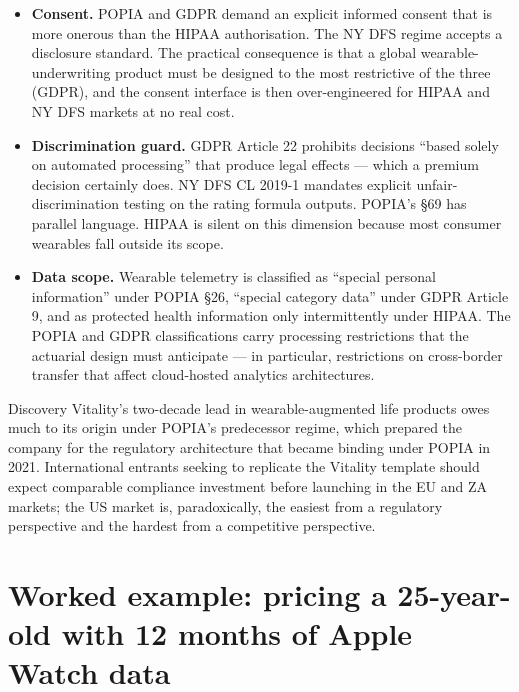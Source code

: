 \documentclass[11pt,a4paper]{article}
\let\origsection\section
\renewcommand{\section}{\clearpage\origsection}
\theoremstyle{ia}
\newcommand{\1}{\mathbf{1}}
\begin{document}
\begin{itemize}[leftmargin=*,nosep,topsep=4pt]
   \item \textbf{Consent.} POPIA and GDPR demand an explicit
         informed consent that is more onerous than the HIPAA
         authorisation. The NY DFS regime accepts a disclosure
         standard. The practical consequence is that a global
         wearable-underwriting product must be designed to the most
         restrictive of the three (GDPR), and the consent
         interface is then over-engineered for HIPAA and NY DFS
         markets at no real cost.
   \item \textbf{Discrimination guard.} GDPR Article 22 prohibits
         decisions ``based solely on automated processing'' that
         produce legal effects --- which a premium decision
         certainly does. NY DFS CL 2019-1 mandates explicit
         unfair-discrimination testing on the rating formula
         outputs. POPIA's §69 has parallel language. HIPAA is
         silent on this dimension because most consumer wearables
         fall outside its scope.
   \item \textbf{Data scope.} Wearable telemetry is classified as
         ``special personal information'' under POPIA §26, ``special
         category data'' under GDPR Article 9, and as protected
         health information only intermittently under HIPAA. The
         POPIA and GDPR classifications carry processing
         restrictions that the actuarial design must anticipate ---
         in particular, restrictions on cross-border transfer that
         affect cloud-hosted analytics architectures.
\end{itemize}

\begin{rbox}
Discovery Vitality's two-decade lead in wearable-augmented life
products owes much to its origin under POPIA's predecessor regime,
which prepared the company for the regulatory architecture that
became binding under POPIA in 2021. International entrants seeking
to replicate the Vitality template should expect comparable
compliance investment before launching in the EU and ZA markets;
the US market is, paradoxically, the easiest from a regulatory
perspective and the hardest from a competitive perspective.
\end{rbox}

\section{Worked example: pricing a 25-year-old with 12 months of Apple Watch data}\label{sec:worked}
\end{document}
